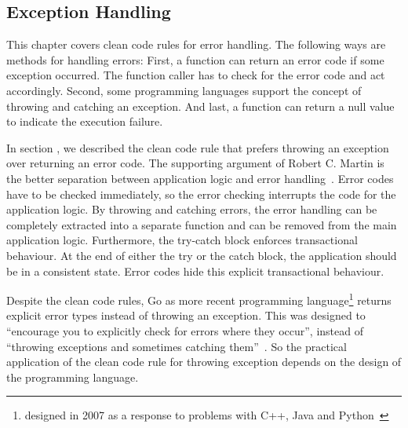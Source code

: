 \subsection{Exception Handling}\label{sec:background:returning_none_and_error_handling}
This chapter covers clean code rules for error handling. The following ways are methods for handling errors:
First, a function can return an error code if some exception occurred. The function caller has to check for the error code and act accordingly. Second, some programming languages support the concept of throwing and catching an exception. And last, a function can return a null value to indicate the execution failure. 

In section , we described the clean code rule that prefers throwing an exception over returning an error code. The supporting argument of Robert C. Martin is the better separation between application logic and error handling~\cite{martin_clean_2009}. Error codes have to be checked immediately, so the error checking interrupts the code for the application logic. By throwing and catching errors, the error handling can be completely extracted into a separate function and can be removed from the main application logic. Furthermore, the try-catch block enforces transactional behaviour. At the end of either the try or the catch block, the application should be in a consistent state. Error codes hide this explicit transactional behaviour. 

Despite the clean code rules, Go as more recent programming language\footnote{designed in 2007 as a response to problems with C++, Java and Python~\cite{noauthor_go_nodate}} returns explicit error types instead of throwing an exception. This was designed to \enquote{encourage you to explicitly check for errors where they occur}, instead of \enquote{throwing exceptions and sometimes catching them}~\cite{gerrand_error_2011}.   
So the practical application of the clean code rule for throwing exception depends on the design of the programming language.

